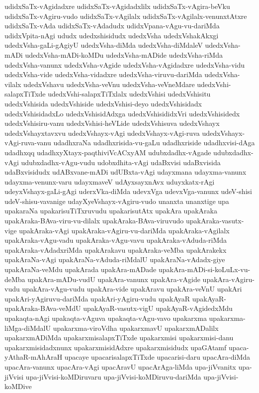 {udidxSaTx-vAgidadxre
udidxSaTx-vAgidadxlilx
udidxSaTx-vAgira-beVku
udidxSaTx-vAgiru-vudo
udidxSaTx-vAgilalx
udidxSaTx-vAgilalx-venunxtAtxre
udidxSaTx-vAda
udidxSaTx-vAdadudx
udidxVpana-vAgu-vu-dariMda
udidxVpita-nAgi
ududx
udedxshisidudx
udedxVsha
udedxVshakAkxgi
udedxVsha-gaLi-gAgiyU
udedxVsha-diMda
udedxVsha-diMdaleV
udedxVsha-mADi
udedxVsha-mADi-koMDu
udedxVsha-mADide
udedxVsha-riMda
udedxVsha-vanunx
udedxVsha-vAgide
udedxVsha-vAgidadxre
udedxVsha-vidu
udedxVsha-vide
udedxVsha-vidadxre
udedxVsha-viruvu-dariMda
udedxVsha-vilalx
udedxVshavu
udedxVsha-veVnu
udedxVsha-veVneMdare
udedxVshi-salapxTiTxde
udedxVshi-salapxTiTxlalx
udedxVshisi
udedxVshisitu
udedxVshisida
udedxVshiside
udedxVshisi-deyo
udedxVshisidadx
udedxVshisidadxLo
udedxVshisidAdxga
udedxVshisididxVri
udedxVshisidedx
udedxVshisiru-vanu
udedxVshisi-heVLide
udedxVshisuva
udedxVshayx
udedxVshayxtavxvu
udedxVshayx-vAgi
udedxVshayx-vAgi-ruva
udedxVshayx-vAgi-ruva-vanu
udadhxraNa
udadhxrisida-vu-gaLu
udadhxriside
udadhxvisi-dAga
udadhxqq
udadhxyXtayx-paqthiviVcACxyAM
udubxdadhx-vAgade
udubxdadhx-vAgi
udubxdadhx-vAgu-vudu
udobxdhita-vAgi
udaBxvisi
udaBxvisida
udaBxvisidudx
udABxvane-mADi
udUBxta-vAgi
udayxmana
udayxma-vanunx
udayxma-venunx-varu
udayxmaveV
udAyxsayxnAvx
uduyxkatx-rAgi
udeyxVshayx-gaLi-gAgi
uderxVka-diMda
udevxVga
udevxVga-vanunx
udeV-shisi
udeV-shisu-vavanige
udayXyeVshayx-vAgiru-vudo
unanxta
unanxtige
upa
upakaraNa
upakarisuTiTxruvudu
upakarisutAtx
upakAra
upakAraka
upakAraka-BAva-viru-vu-dilalx
upakAraka-BAva-viruvudo
upakAraka-vasutx-vige
upakAraka-vAgi
upakAraka-vAgiru-vu-dariMda
upakAraka-vAgilalx
upakAraka-vAgu-vadu
upakAraka-vAgu-vavu
upakAraka-vAduda-riMda
upakAraka-vAdadxriMda
upakArakavu
upakAraka-veMba
upakArakekx
upakAraNa-vAgi
upakAraNa-vAduda-riMdalU
upakAraNa-vAdadx-giye
upakAraNa-veMdu
upakArada
upakAra-mADade
upakAra-mADi-si-koLuLx-vu-deMba
upakAra-mADu-vudU
upakAra-vanunx
upakAra-vAgide
upakAra-vAgiru-vudu
upakAra-vAgu-vudu
upakAra-vide
upakAravu
upakAra-veVnU
upakAri
upakAri-yAgiruvu-dariMda
upakAri-yAgiru-vudu
upakAyaR
upakAyaR-upakAraka-BAva-veMdU
upakAyaR-vasutx-vigU
upakAyaR-vAgidedxMdu
upakaqta-nAgi
upakaqta-vAguva
upakaqta-vAgu-vavo
upakarxma
upakarxma-liMga-diMdalU
upakarxma-viroVdha
upakarxmavU
upakarxmADalilx
upakarxmADiMda
upakarxmisalapxTiTxde
upakarxmisi
upakarxmisi-danu
upakarxmisidadxnunx
upakarxmisidAdxre
upakarxmisidudx
upaGAtamf
upaca-yAthaR-mAhAraH
upacaye
upacarisalapxTiTxde
upacarisi-daru
upacAra-diMda
upacAra-vanunx
upacAra-vAgi
upacAravU
upacArAga-liMda
upa-jiVvanitx
upa-jiVvisi
upa-jiVvisi-koMDiruvaru
upa-jiVvisi-koMDiruvu-dariMda
upa-jiVvisi-koMDive
}
